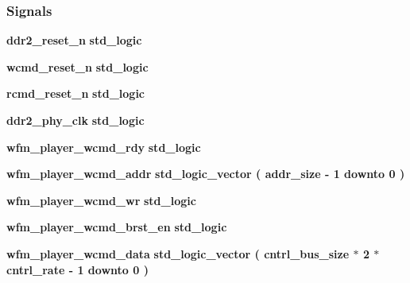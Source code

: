 \subsubsection*{Signals}
 \begin{DoxyCompactItemize}
\item 
{\bf ddr2\+\_\+reset\+\_\+n} {\bfseries \textcolor{comment}{std\+\_\+logic}\textcolor{vhdlchar}{ }} 
\item 
{\bf wcmd\+\_\+reset\+\_\+n} {\bfseries \textcolor{comment}{std\+\_\+logic}\textcolor{vhdlchar}{ }} 
\item 
{\bf rcmd\+\_\+reset\+\_\+n} {\bfseries \textcolor{comment}{std\+\_\+logic}\textcolor{vhdlchar}{ }} 
\item 
{\bf ddr2\+\_\+phy\+\_\+clk} {\bfseries \textcolor{comment}{std\+\_\+logic}\textcolor{vhdlchar}{ }} 
\item 
{\bf wfm\+\_\+player\+\_\+wcmd\+\_\+rdy} {\bfseries \textcolor{comment}{std\+\_\+logic}\textcolor{vhdlchar}{ }} 
\item 
{\bf wfm\+\_\+player\+\_\+wcmd\+\_\+addr} {\bfseries \textcolor{comment}{std\+\_\+logic\+\_\+vector}\textcolor{vhdlchar}{ }\textcolor{vhdlchar}{(}\textcolor{vhdlchar}{ }\textcolor{vhdlchar}{ }\textcolor{vhdlchar}{ }\textcolor{vhdlchar}{ }{\bfseries {\bf addr\+\_\+size}} \textcolor{vhdlchar}{-\/}\textcolor{vhdlchar}{ } \textcolor{vhdldigit}{1} \textcolor{vhdlchar}{ }\textcolor{keywordflow}{downto}\textcolor{vhdlchar}{ }\textcolor{vhdlchar}{ } \textcolor{vhdldigit}{0} \textcolor{vhdlchar}{ }\textcolor{vhdlchar}{)}\textcolor{vhdlchar}{ }} 
\item 
{\bf wfm\+\_\+player\+\_\+wcmd\+\_\+wr} {\bfseries \textcolor{comment}{std\+\_\+logic}\textcolor{vhdlchar}{ }} 
\item 
{\bf wfm\+\_\+player\+\_\+wcmd\+\_\+brst\+\_\+en} {\bfseries \textcolor{comment}{std\+\_\+logic}\textcolor{vhdlchar}{ }} 
\item 
{\bf wfm\+\_\+player\+\_\+wcmd\+\_\+data} {\bfseries \textcolor{comment}{std\+\_\+logic\+\_\+vector}\textcolor{vhdlchar}{ }\textcolor{vhdlchar}{(}\textcolor{vhdlchar}{ }\textcolor{vhdlchar}{ }\textcolor{vhdlchar}{ }\textcolor{vhdlchar}{ }{\bfseries {\bf cntrl\+\_\+bus\+\_\+size}} \textcolor{vhdlchar}{$\ast$}\textcolor{vhdlchar}{ } \textcolor{vhdldigit}{2} \textcolor{vhdlchar}{$\ast$}\textcolor{vhdlchar}{ }\textcolor{vhdlchar}{ }\textcolor{vhdlchar}{ }{\bfseries {\bf cntrl\+\_\+rate}} \textcolor{vhdlchar}{-\/}\textcolor{vhdlchar}{ } \textcolor{vhdldigit}{1} \textcolor{vhdlchar}{ }\textcolor{keywordflow}{downto}\textcolor{vhdlchar}{ }\textcolor{vhdlchar}{ } \textcolor{vhdldigit}{0} \textcolor{vhdlchar}{ }\textcolor{vhdlchar}{)}\textcolor{vhdlchar}{ }} 

\end{DoxyCompactItemize}
